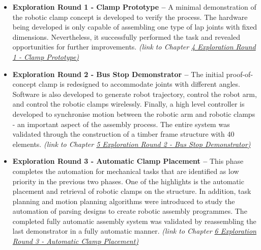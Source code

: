 \begin{itemize}
    
    \item \textbf{Exploration Round 1 - Clamp Prototype --} A minimal demonstration of the robotic clamp concept is developed to verify the process. The hardware being developed is only capable of assembling one type of lap joints with fixed dimensions. Nevertheless, it successfully performed the task and revealed opportunities for further improvements. \textit{(link to Chapter \ul{4 Exploration Round 1 - Clamp Prototype)}}
    
    \item \textbf{Exploration Round 2 - Bus Stop Demonstrator --} The initial proof-of-concept clamp is redesigned to accommodate joints with different angles. Software is also developed to generate robot trajectory, control the robot arm, and control the robotic clamps wirelessly. Finally, a high level controller is developed to synchronise motion between the robotic arm and robotic clamps - an important aspect of the assembly process. The entire system was validated through the construction of a timber frame structure with 40 elements. \textit{(link to Chapter \ul{5 Exploration Round 2 - Bus Stop Demonstrator)}}
    
    \item \textbf{Exploration Round 3 - Automatic Clamp Placement --} This phase completes the automation for mechanical tasks that are identified as low priority in the previous two phases. One of the highlights is the automatic placement and retrieval of robotic clamps on the structure. In addition, task planning and motion planning algorithms were introduced to study the automation of parsing designs to create robotic assembly programmes. The completed fully automatic assembly system was validated by reassembling the last demonstrator in a fully automatic manner.  \textit{(link to Chapter \ul{6 Exploration Round 3 - Automatic Clamp Placement)}}
 

\end{itemize}
